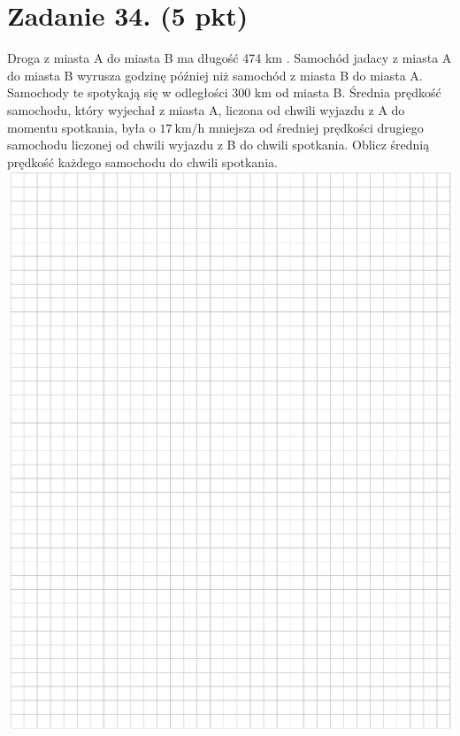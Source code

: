 \documentclass[10pt]{article}
\begin{document}
\section*{Zadanie 34. (5 pkt)}
Droga z miasta A do miasta B ma długość 474 km . Samochód jadacy z miasta A do miasta B wyrusza godzinę później niż samochód z miasta B do miasta A. Samochody te spotykają się w odległości 300 km od miasta B. Średnia prędkość samochodu, który wyjechał z miasta A, liczona od chwili wyjazdu z A do momentu spotkania, była o \(17 \mathrm{~km} / \mathrm{h}\) mniejsza od średniej prędkości drugiego samochodu liczonej od chwili wyjazdu z B do chwili spotkania. Oblicz średnią prędkość każdego samochodu do chwili spotkania.\\
\includegraphics[max width=\textwidth, center]{2024_11_21_603d5c1b2a7d8d68f45fg-18}
\end{document}
